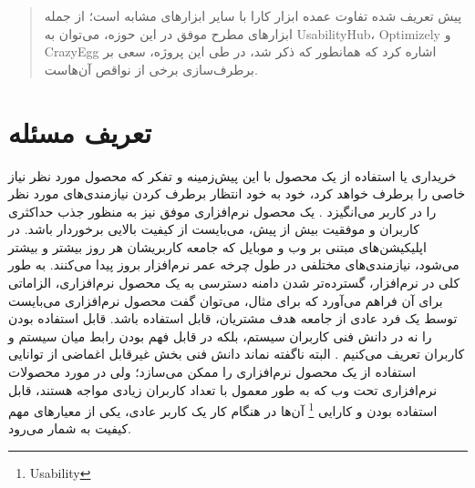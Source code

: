 \documentclass{article}
\theoremstyle{definition}
\begin{document}
\begin{abstract}
پیش تعریف شده تفاوت عمده ابزار کارا با سایر ابزارهای مشابه است؛ از جمله ابزارهای مطرح موفق در این حوزه، می‌توان به UsabilityHub، Optimizely و CrazyEgg اشاره کرد که همانطور که ذکر شد، در طی این پروژه، سعی بر برطرف‌سازی برخی از نواقص آن‌هاست.
	\end{abstract}
	\newpage
	\tableofcontents
	\newpage
	\section{تعریف مسئله}
خریداری یا استفاده از یک محصول با این پیش‌زمینه و تفکر که محصول مورد نظر نیاز خاصی را برطرف خواهد کرد، خود به خود انتظار برطرف کردن نیازمندی‌های مورد نظر را در کاربر می‌انگیزد
\cite{abdollahzade}.
یک محصول نرم‌افزاری موفق نیز به منظور جذب حداکثری کاربران و موفقیت بیش از پیش، می‌بایست از کیفیت بالایی برخوردار باشد. در اپلیکیشن‌های مبتنی بر وب و موبایل که جامعه کاربریشان هر روز بیشتر و بیشتر می‌شود، نیازمندی‌های مختلفی در طول چرخه عمر نرم‌افزار بروز پیدا می‌کنند. به طور کلی در نرم‌افزار،  گسترده‌تر شدن دامنه دسترسی به یک محصول نرم‌افزاری، الزاماتی برای آن فراهم می‌آورد که برای مثال، می‌توان گفت محصول نرم‌افزاری می‌بایست توسط یک فرد عادی از جامعه هدف مشتریان، قابل استفاده باشد. قابل استفاده بودن را نه در دانش فنی کاربران سیستم، بلکه در قابل فهم بودن رابط میان سیستم و کاربران تعریف می‌کنیم
\cite{measuring}.
البته ناگفته نماند دانش فنی بخش غیرقابل اغماضی از توانایی استفاده از یک محصول نرم‌افزاری را ممکن می‌سازد؛ ولی در مورد محصولات نرم‌افزاری تحت وب که به طور معمول با تعداد کاربران زیادی مواجه هستند، قابل استفاده بودن و کارایی 
\footnote{Usability}
آن‌ها در هنگام کار یک کاربر عادی، یکی از معیارهای مهم کیفیت به شمار می‌رود.
\end{document}
